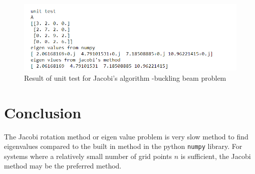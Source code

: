 \documentclass{article}
\begin{document}
\begin{figure}[H]
 	 \includegraphics[width=\linewidth]{unittestresult.png}
	\caption{  Result of unit test for Jacobi's algorithm -buckling beam problem}
  \label{fig:Result of unit test for Jacobi's algorithm -buckling beam problem }
\end{figure}

\section{Conclusion}
The Jacobi rotation method or eigen value problem is very slow method to find eigenvalues compared to the built in method  in the python \texttt{numpy} library.
 For systems where a relatively small number of grid points $n$ is sufficient, the Jacobi method may be the preferred method. 
\end{document}

